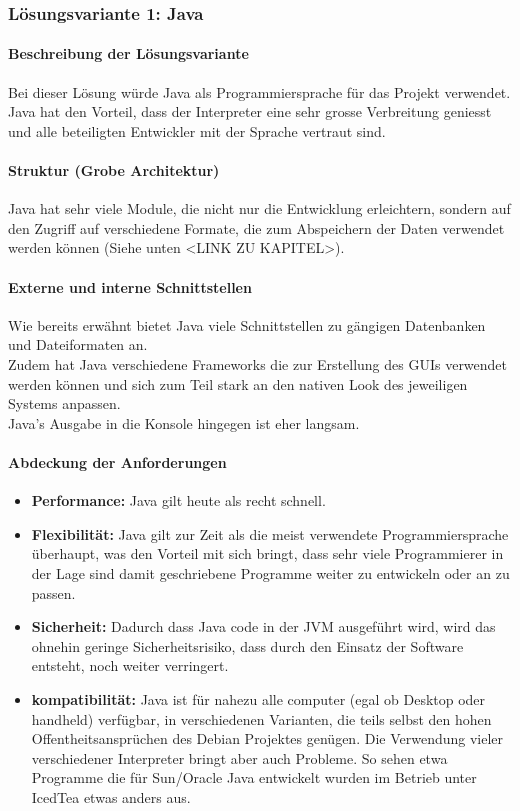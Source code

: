 \documentclass[10pt,paper=a4,final]{scrartcl}
\begin{document}
\subsubsection{L\"osungsvariante 1: Java}
\paragraph{Beschreibung der L\"osungsvariante}
Bei dieser L\"osung w\"urde Java als Programmiersprache f\"ur das Projekt verwendet. Java hat den Vorteil, dass der Interpreter eine sehr grosse Verbreitung geniesst und alle beteiligten Entwickler mit der Sprache vertraut sind.
\paragraph{Struktur (Grobe Architektur)}
Java hat sehr viele Module, die nicht nur die Entwicklung erleichtern, sondern auf den Zugriff auf verschiedene Formate, die zum Abspeichern der Daten verwendet werden k\"onnen (Siehe unten <LINK ZU KAPITEL>).
\paragraph{Externe und interne Schnittstellen}
Wie bereits erw\"ahnt bietet Java viele Schnittstellen zu g\"angigen Datenbanken und Dateiformaten an.\\
Zudem hat Java verschiedene Frameworks die zur Erstellung des GUIs verwendet werden k\"onnen und sich zum Teil stark an den nativen Look des jeweiligen Systems anpassen.\\
Java’s Ausgabe in die Konsole hingegen ist eher langsam.\\
\paragraph{Abdeckung der Anforderungen}
\begin{itemize}
  \item {\bf Performance:} Java gilt heute als recht schnell.
  \item {\bf Flexibilit\"at:} Java gilt zur Zeit als die meist verwendete Programmiersprache \"uberhaupt, was den Vorteil mit sich bringt, dass sehr viele Programmierer in der Lage sind damit geschriebene Programme weiter zu entwickeln oder an zu passen.
  \item {\bf Sicherheit:} Dadurch dass Java code in der JVM ausgef\"uhrt wird, wird das ohnehin geringe Sicherheitsrisiko, dass durch den Einsatz der Software entsteht, noch weiter verringert.
  \item {\bf kompatibilit\"at:} Java ist f\"ur nahezu alle computer (egal ob Desktop oder handheld) verf\"ugbar, in verschiedenen Varianten, die teils selbst den hohen Offentheitsanspr\"uchen des Debian Projektes gen\"ugen. Die Verwendung vieler verschiedener Interpreter bringt aber auch Probleme. So sehen etwa Programme die f\"ur Sun/Oracle Java entwickelt wurden im Betrieb unter IcedTea etwas anders aus.
\end{itemize}
\end{document}
